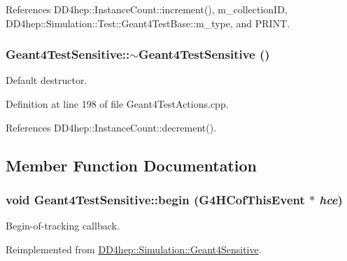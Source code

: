 References DD4hep::InstanceCount::increment(), m\_\-collectionID, DD4hep::Simulation::Test::Geant4TestBase::m\_\-type, and PRINT.\hypertarget{class_d_d4hep_1_1_simulation_1_1_test_1_1_geant4_test_sensitive_a0f7b16af79f07274792ef1690a45d93c}{
\subsubsection[{$\sim$Geant4TestSensitive}]{\setlength{\rightskip}{0pt plus 5cm}Geant4TestSensitive::$\sim$Geant4TestSensitive ()}}
\label{class_d_d4hep_1_1_simulation_1_1_test_1_1_geant4_test_sensitive_a0f7b16af79f07274792ef1690a45d93c}


Default destructor. 

Definition at line 198 of file Geant4TestActions.cpp.

References DD4hep::InstanceCount::decrement().

\subsection{Member Function Documentation}
\hypertarget{class_d_d4hep_1_1_simulation_1_1_test_1_1_geant4_test_sensitive_a7d7593372b9bfcc1e1a3f21ceef841d8}{
\subsubsection[{begin}]{\setlength{\rightskip}{0pt plus 5cm}void Geant4TestSensitive::begin (G4HCofThisEvent $\ast$ {\em hce})}}
\label{class_d_d4hep_1_1_simulation_1_1_test_1_1_geant4_test_sensitive_a7d7593372b9bfcc1e1a3f21ceef841d8}


Begin-\/of-\/tracking callback. 

Reimplemented from \hyperlink{class_d_d4hep_1_1_simulation_1_1_geant4_sensitive_a2967b095e6c32ae82f68a8b25a086c86}{DD4hep::Simulation::Geant4Sensitive}.

